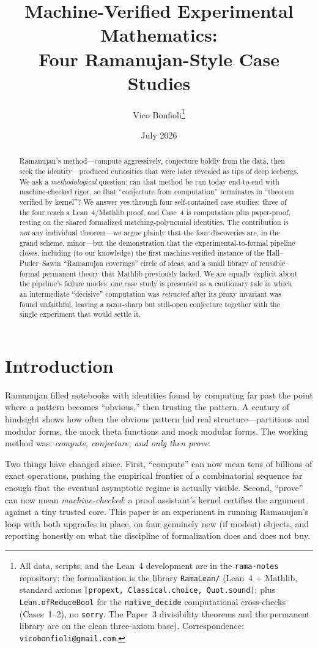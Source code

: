 \documentclass[11pt]{article}
\title{Machine-Verified Experimental Mathematics:\\
Four Ramanujan-Style Case Studies}
\author{Vico Bonfioli\thanks{All data, scripts, and the
Lean~4 development are in the \texttt{rama-notes} repository; the formalization is the
library \texttt{RamaLean/} (Lean~4 + Mathlib, standard axioms
\texttt{[propext, Classical.choice, Quot.sound]}; plus \texttt{Lean.ofReduceBool}
for the \texttt{native\_decide} computational cross-checks (Cases~1--2), no
\texttt{sorry}. The Paper~3 divisibility theorems and the permanent library are on
the clean three-axiom base). Correspondence: \texttt{vicobonfioli@gmail.com}.}}
\date{July 2026}
\theoremstyle{remark}\newtheorem{remark}[theorem]{Remark}
\begin{document}
\maketitle

\begin{abstract}
Ramanujan's method---compute aggressively, conjecture boldly from the data, then
seek the identity---produced curiosities that were later revealed as tips of deep
icebergs. We ask a \emph{methodological} question: can that method be run today
end-to-end with machine-checked rigor, so that ``conjecture from computation''
terminates in ``theorem verified by kernel''? We answer yes through four
self-contained case studies: three of the four reach a Lean~4/Mathlib proof, and
Case~4 is computation plus paper-proof, resting on the shared formalized
matching-polynomial identities. The contribution is \emph{not} any individual theorem---we
argue plainly that the four discoveries are, in the grand scheme, minor---but the
demonstration that the experimental-to-formal pipeline closes, including (to our
knowledge) the first machine-verified instance of the Hall--Puder--Sawin
``Ramanujan coverings'' circle of ideas, and a small library of reusable formal
permanent theory that Mathlib previously lacked. We are equally explicit about the
pipeline's failure modes: one case study is presented as a cautionary tale in
which an intermediate ``decisive'' computation was \emph{retracted} after its
proxy invariant was found unfaithful, leaving a razor-sharp but still-open
conjecture together with the single experiment that would settle it.
\end{abstract}

\section{Introduction}

Ramanujan filled notebooks with identities found by computing far past the point
where a pattern becomes ``obvious,'' then trusting the pattern. A century of
hindsight shows how often the obvious pattern hid real structure---partitions and
modular forms, the mock theta functions and mock modular forms. The working method
was: \emph{compute, conjecture, and only then prove.}

Two things have changed since. First, ``compute'' can now mean tens of billions of
exact operations, pushing the empirical frontier of a combinatorial sequence far
enough that the eventual asymptotic regime is actually visible. Second,
``prove'' can now mean \emph{machine-checked}: a proof assistant's kernel certifies
the argument against a tiny trusted core. This paper is an experiment in running
Ramanujan's loop with both upgrades in place, on four genuinely new (if modest)
objects, and reporting honestly on what the discipline of formalization does and
does not buy.
\end{document}
